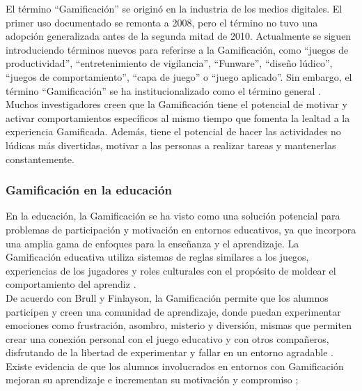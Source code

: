 El término ``Gamificación'' se originó en la industria de los medios digitales. El primer uso documentado se remonta a 2008, pero el término no tuvo una adopción generalizada antes de la segunda mitad de 2010. Actualmente se siguen introduciendo términos nuevos para referirse a la Gamificación, como ``juegos de productividad'', ``entretenimiento de vigilancia'', ``Funware'', ``diseño lúdico'', ``juegos de comportamiento'', ``capa de juego'' o ``juego aplicado''. Sin embargo, el término ``Gamificación'' se ha institucionalizado como el término general \cite{definicion1}.\\
    
\noindent Muchos investigadores creen que la Gamificación tiene el potencial de motivar y activar comportamientos específicos al mismo tiempo que fomenta la lealtad a la experiencia Gamificada. Además, tiene el potencial de hacer las actividades no lúdicas más divertidas, motivar a las personas a realizar tareas y mantenerlas constantemente. \cite{education1}

\clearpage

\subsubsection{Gamificación en la educación}

En la educación, la Gamificación se ha visto como una solución potencial para problemas de participación y motivación en entornos educativos, ya que incorpora una amplia gama de enfoques para la enseñanza y el aprendizaje. La Gamificación educativa utiliza sistemas de reglas similares a los juegos, experiencias de los jugadores y roles culturales con el propósito de moldear el comportamiento del aprendiz \cite{education1}.\\
    
\noindent De acuerdo con Brull y Finlayson, la Gamificación permite que los alumnos participen y creen una comunidad de aprendizaje, donde puedan experimentar emociones como frustración, asombro, misterio y diversión, mismas que permiten crear una conexión personal con el juego educativo y con otros compañeros, disfrutando de la libertad de experimentar y fallar en un entorno agradable \cite{education3}.\\ %
    
\noindent Existe evidencia de que los alumnos involucrados en entornos con Gamificación mejoran su aprendizaje e incrementan su motivación y compromiso \cite{education4}; %

